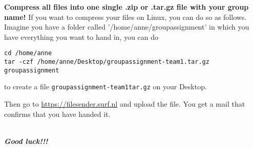 \textbf{Compress all files into one single .zip or .tar.gz file with your group name!}
If you want to compress your files on Linux, you can do so as follows. Imagine you have a folder called '/home/anne/groupassignment' in which you have everything you want to hand in, you can do

\begin{lstlisting}
cd /home/anne
tar -czf /home/anne/Desktop/groupassignment-team1.tar.gz groupassignment
\end{lstlisting}
to create a file \texttt{groupassignment-team1tar.gz} on your Desktop.

Then go to \url{https://filesender.surf.nl} and upload the file.
You get a mail that confirms that you have handed it. 

~\\
\textbf{\emph{Good luck!!!}}